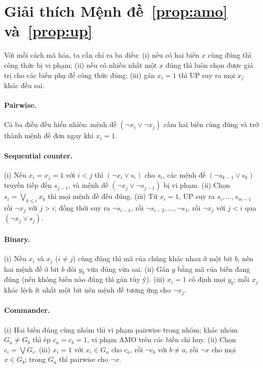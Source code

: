 \documentclass[a4paper,fleqn]{cas-sc}
\begin{document}
\appendix
\renewcommand{\thesection}{Appendix~\Alph{section}}

\section{Giải thích Mệnh đề~\ref{prop:amo} và~\ref{prop:up}}\label{app:proofs}

Với mỗi cách mã hóa, ta cần chỉ ra ba điều: (i) nếu có hai biến $x$ cùng đúng thì công thức bị vi phạm; (ii) nếu có nhiều nhất một $x$ đúng thì luôn chọn được giá trị cho các biến phụ để công thức đúng; (iii) gán $x_i=1$ thì UP suy ra mọi $x_j$ khác đều sai.

\paragraph{Pairwise.} Cả ba điều đều hiển nhiên: mệnh đề $(\neg x_i\vee\neg x_j)$ cấm hai biến cùng đúng và trở thành mệnh đề đơn ngay khi $x_i=1$.

\paragraph{Sequential counter.} (i) Nếu $x_i=x_j=1$ với $i<j$ thì $(\neg x_i\vee s_i)$ cho $s_i$, các mệnh đề $(\neg s_{k-1}\vee s_k)$ truyền tiếp đến $s_{j-1}$, và mệnh đề $(\neg x_j\vee\neg s_{j-1})$ bị vi phạm. (ii) Chọn $s_i=\bigvee_{k\le i}x_k$ thì mọi mệnh đề đều đúng. (iii) Từ $x_i=1$, UP suy ra $s_i,\dots,s_{m-1}$ rồi $\neg x_j$ với $j>i$; đồng thời suy ra $\neg s_{i-1}$, rồi $\neg s_{i-2},\dots,\neg s_1$, rồi $\neg x_j$ với $j<i$ qua $(\neg x_j\vee s_j)$.

\paragraph{Binary.} (i) Nếu $x_i$ và $x_j$ ($i\neq j$) cùng đúng thì mã của chúng khác nhau ở một bit $b$, nên hai mệnh đề ở bit $b$ đòi $y_b$ vừa đúng vừa sai. (ii) Gán $y$ bằng mã của biến đang đúng (nếu không biến nào đúng thì gán tùy ý). (iii) $x_i=1$ cố định mọi $y_b$; mỗi $x_j$ khác lệch ít nhất một bit nên mệnh đề tương ứng cho $\neg x_j$.

\paragraph{Commander.} (i) Hai biến đúng cùng nhóm thì vi phạm pairwise trong nhóm; khác nhóm $G_a\neq G_b$ thì ép $c_a=c_b=1$, vi phạm AMO trên các biến chỉ huy. (ii) Chọn $c_i=\bigvee G_i$. (iii) $x_i=1$ với $x_i\in G_a$ cho $c_a$, rồi $\neg c_b$ với $b\neq a$, rồi $\neg x$ cho mọi $x\in G_b$; trong $G_a$ thì pairwise cho $\neg x$.
\end{document}

